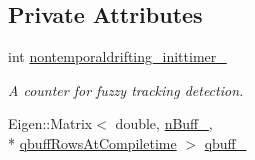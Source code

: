 \subsection*{Private Attributes}
\begin{DoxyCompactItemize}
\item 
int \hyperlink{classmsf__core_1_1CheckFuzzyTracking_af51abec3e790879abe78802742a6eb00}{nontemporaldrifting\-\_\-inittimer\-\_\-}
\begin{DoxyCompactList}\small\item\em A counter for fuzzy tracking detection. \end{DoxyCompactList}\item 
Eigen\-::\-Matrix$<$ double, \hyperlink{classmsf__core_1_1CheckFuzzyTracking_a6f126748326deeb3a587c1a1941989eba61c3173392a55f3aaef6cd896f33ab10}{n\-Buff\-\_\-}, \\*
\hyperlink{classmsf__core_1_1CheckFuzzyTracking_a6f126748326deeb3a587c1a1941989ebaf79d708cc771616ae3aa19084acb2d77}{qbuff\-Rows\-At\-Compiletime} $>$ \hyperlink{classmsf__core_1_1CheckFuzzyTracking_af1c7c576c8731d752a72d4e75f0a6078}{qbuff\-\_\-}
\end{DoxyCompactItemize}


